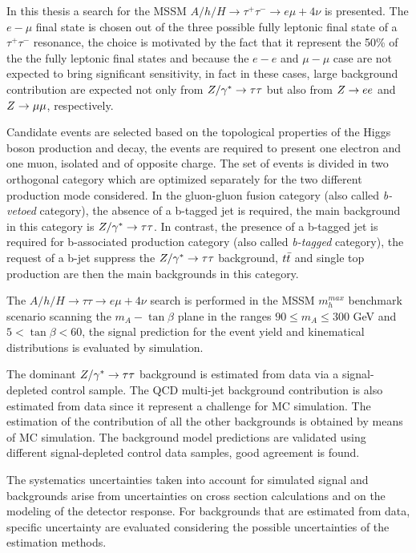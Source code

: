 In this thesis a search for the MSSM 
$A/h/H \rightarrow \tau^+ \tau^- \rightarrow e \mu +4\nu$ is presented. The $e-\mu$ final state 
is chosen out of the three possible fully 
leptonic final state of a $\tau^+ \tau^-$ resonance,
the choice is motivated by the fact that it represent the 50\% of the the fully leptonic final states and 
because the $e-e$ and $\mu-\mu$ case are not expected to bring significant sensitivity, in fact in these cases, large background
contribution are expected not only from $Z/\gamma^*\rightarrow \tau\tau$ but also from $Z\rightarrow ee$ and $Z\rightarrow \mu\mu$,  respectively.

Candidate events are selected based on the topological properties of the Higgs boson production
and decay, the events are required to present one electron and one muon, isolated and of opposite charge.
The set of events is divided in two orthogonal category which are optimized separately
for the two different production mode considered. In the gluon-gluon fusion category (also called \emph{b-vetoed} category),
the absence of a b-tagged jet is required, the main background in this category is $Z/\gamma^*\rightarrow \tau\tau$. 
In contrast, the presence of a b-tagged jet is required for b-associated production category (also called 
\emph{b-tagged} category), the request of a b-jet suppress the $Z/\gamma^*\rightarrow \tau\tau$ background, $t\bar{t}$ and single top production
are then the main backgrounds in this category.

The $A/h/H \rightarrow\tau\tau \rightarrow e\mu+ 4\nu$ search is performed in the MSSM $m_h^{max}$ benchmark scenario
scanning the $m_A - \tan\beta$ plane in the ranges $90 \leq m_A \leq 300$ GeV and $5 < \tan\beta < 60$,
the signal prediction for the event yield and kinematical distributions is evaluated by simulation.

The dominant $Z/\gamma^*\rightarrow \tau\tau$ background is estimated from data via a signal-depleted control sample.
The  QCD multi-jet background contribution is also estimated from data since it represent a challenge for MC simulation.  
The estimation of the contribution of  all the other backgrounds is obtained by means of MC simulation.
The background model predictions are validated using different signal-depleted control data samples, 
good agreement is found.

The systematics uncertainties taken into account for simulated signal and backgrounds arise from uncertainties on  
cross section calculations and on the modeling of the detector response. For backgrounds that are estimated from data,
specific uncertainty are evaluated considering the possible uncertainties of the estimation methods.


